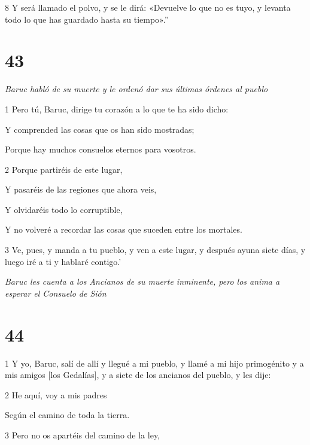 \par 8 Y será llamado el polvo, y se le dirá: «Devuelve lo que no es tuyo, y levanta todo lo que has guardado hasta su tiempo».''


\chapter{43}

\par \textit{Baruc habló de su muerte y le ordenó dar sus últimas órdenes al pueblo}

\par 1 Pero tú, Baruc, dirige tu corazón a lo que te ha sido dicho:

\par Y comprended las cosas que os han sido mostradas;

\par Porque hay muchos consuelos eternos para vosotros.

\par 2 Porque partiréis de este lugar,

Y pasaréis de las regiones que ahora veis,

\par Y olvidaréis todo lo corruptible,

\par Y no volveré a recordar las cosas que suceden entre los mortales.

\par 3 Ve, pues, y manda a tu pueblo, y ven a este lugar, y después ayuna siete días, y luego iré a ti y hablaré contigo.'

\par \textit{Baruc les cuenta a los Ancianos de su muerte inminente, pero los anima a esperar el Consuelo de Sión}

\chapter{44}

\par 1 Y yo, Baruc, salí de allí y llegué a mi pueblo, y llamé a mi hijo primogénito y a mis amigos [los Gedalías], y a siete de los ancianos del pueblo, y les dije:

\par 2 He aquí, voy a mis padres

\par Según el camino de toda la tierra.

\par 3 Pero no os apartéis del camino de la ley,

